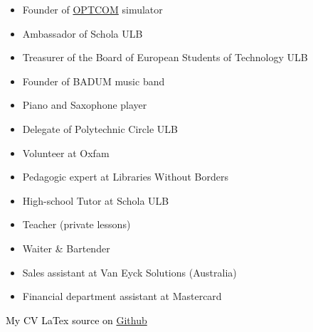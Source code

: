 
\vspace{1em}


\begin{itemize}
\item Founder of \href{https://github.com/optcom-org/optcom}{OPTCOM} simulator
\item Ambassador of Schola ULB
\item Treasurer of the Board of European Students of Technology ULB
\item Founder of BADUM music band
\item Piano and Saxophone player
\item Delegate of Polytechnic Circle ULB
\item Volunteer at Oxfam
\end{itemize}
\vspace{1em}

\vspace{1em}

\vspace{1em}

\vspace{1em}

\vspace{1em}

\begin{itemize}
    \item Pedagogic expert at Libraries Without Borders
    \item High-school Tutor at Schola ULB
    \item Teacher (private lessons)
    \item Waiter \& Bartender
    \item Sales assistant at Van Eyck Solutions (Australia)
    \item Financial department assistant at Mastercard
\end{itemize}

\vspace{4em}
\hspace{8em}\textcolor{black}{My CV LaTex source on}
\href{https://github.com/sachamedaer/CV}{Github}
\vspace{10em}